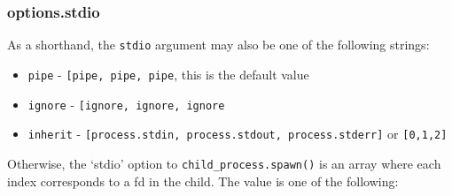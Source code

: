 \subsubsection{options.stdio}\label{options.stdio}

As a shorthand, the \texttt{stdio} argument may also be one of the
following strings:

\begin{itemize}
\itemsep1pt\parskip0pt
\item
  \texttt{\textquotesingle{}pipe\textquotesingle{}} -
  \texttt{{[}\textquotesingle{}pipe\textquotesingle{},\ \textquotesingle{}pipe\textquotesingle{},\ \textquotesingle{}pipe\textquotesingle{}{]}},
  this is the default value
\item
  \texttt{\textquotesingle{}ignore\textquotesingle{}} -
  \texttt{{[}\textquotesingle{}ignore\textquotesingle{},\ \textquotesingle{}ignore\textquotesingle{},\ \textquotesingle{}ignore\textquotesingle{}{]}}
\item
  \texttt{\textquotesingle{}inherit\textquotesingle{}} -
  \texttt{{[}process.stdin,\ process.stdout,\ process.stderr{]}} or
  \texttt{{[}0,1,2{]}}
\end{itemize}

Otherwise, the `stdio' option to \texttt{child\_process.spawn()} is an
array where each index corresponds to a fd in the child. The value is
one of the following:

